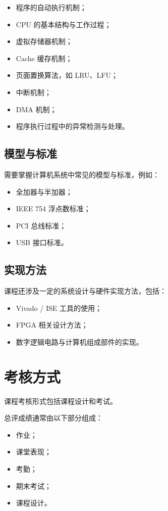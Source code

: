 \documentclass[12pt,a4paper]{ctexart}
\begin{document}
\begin{itemize}
    \item 程序的自动执行机制；
    \item CPU 的基本结构与工作过程；
    \item 虚拟存储器机制；
    \item Cache 缓存机制；
    \item 页面置换算法，如 LRU、LFU；
    \item 中断机制；
    \item DMA 机制；
    \item 程序执行过程中的异常检测与处理。
\end{itemize}

\subsection{模型与标准}

需要掌握计算机系统中常见的模型与标准，例如：

\begin{itemize}
    \item 全加器与半加器；
    \item IEEE 754 浮点数标准；
    \item PCI 总线标准；
    \item USB 接口标准。
\end{itemize}

\subsection{实现方法}

课程还涉及一定的系统设计与硬件实现方法，包括：

\begin{itemize}
    \item Vivado / ISE 工具的使用；
    \item FPGA 相关设计方法；
    \item 数字逻辑电路与计算机组成部件的实现。
\end{itemize}

\section{考核方式}

课程考核形式包括课程设计和考试。

总评成绩通常由以下部分组成：

\begin{itemize}
    \item 作业；
    \item 课堂表现；
    \item 考勤；
    \item 期末考试；
    \item 课程设计。
\end{itemize}
\end{document}
